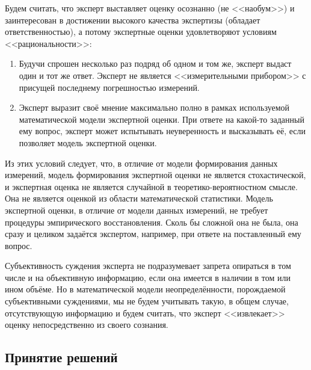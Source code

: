 Будем считать, что эксперт выставляет оценку осознанно (не <<наобум>>) и заинтересован в достижении высокого качества экспертизы (обладает ответственностью), а потому экспертные оценки удовлетворяют условиям <<рациональности>>:
\begin{enumerate}
 \item Будучи спрошен несколько раз подряд об одном и том же, эксперт выдаст один и тот же ответ. Эксперт не является <<измерительными прибором>> с присущей последнему погрешностью измерений. 
 \item Эксперт выразит своё мнение максимально полно в рамках используемой математической модели экспертной оценки. При ответе на какой-то заданный ему вопрос, эксперт может испытывать неуверенность и высказывать её, если позволяет модель экспертной оценки.
\end{enumerate}

 Из этих условий следует, что, в отличие от модели формирования данных измерений, модель формирования экспертной оценки не является стохастической, и экспертная оценка не является случайной в теоретико-вероятностном смысле. Она не является оценкой из области математической статистики. Модель экспертной оценки, в отличие от модели данных измерений, не требует процедуры эмпирического восстановления. Сколь бы сложной она не была, она сразу и целиком задаётся экспертом, например, при ответе на поставленный ему вопрос.
  
Субъективность суждения эксперта не подразумевает запрета опираться в том числе и на объективную информацию, если она имеется в наличии в том или ином объёме. Но в математической модели неопределённости, порождаемой субъективными суждениями, мы не будем учитывать такую, в общем случае, отсутствующую информацию и будем считать, что эксперт <<извлекает>> оценку непосредственно из своего сознания. 


\subsection{Принятие решений}
\label{sec:intro_decision}

